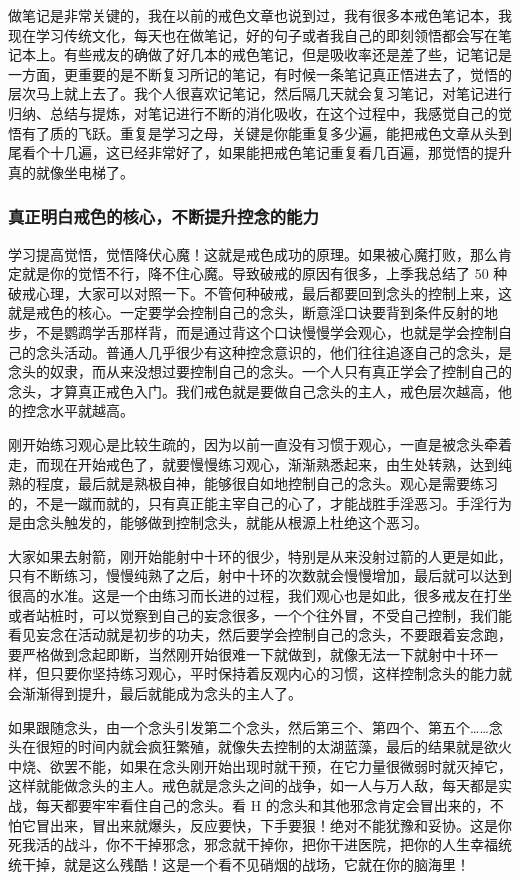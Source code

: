 做笔记是非常关键的，我在以前的戒色文章也说到过，我有很多本戒色笔记本，我现在学习传统文化，每天也在做笔记，好的句子或者我自己的即刻领悟都会写在笔记本上。有些戒友的确做了好几本的戒色笔记，但是吸收率还是差了些，记笔记是一方面，更重要的是不断复习所记的笔记，有时候一条笔记真正悟进去了，觉悟的层次马上就上去了。我个人很喜欢记笔记，然后隔几天就会复习笔记，对笔记进行归纳、总结与提炼，对笔记进行不断的消化吸收，在这个过程中，我感觉自己的觉悟有了质的飞跃。重复是学习之母，关键是你能重复多少遍，能把戒色文章从头到尾看个十几遍，这已经非常好了，如果能把戒色笔记重复看几百遍，那觉悟的提升真的就像坐电梯了。

\subsubsection{真正明白戒色的核心，不断提升控念的能力}

学习提高觉悟，觉悟降伏心魔！这就是戒色成功的原理。如果被心魔打败，那么肯定就是你的觉悟不行，降不住心魔。导致破戒的原因有很多，上季我总结了 50 种破戒心理，大家可以对照一下。不管何种破戒，最后都要回到念头的控制上来，这就是戒色的核心。一定要学会控制自己的念头，断意淫口诀要背到条件反射的地步，不是鹦鹉学舌那样背，而是通过背这个口诀慢慢学会观心，也就是学会控制自己的念头活动。普通人几乎很少有这种控念意识的，他们往往追逐自己的念头，是念头的奴隶，而从来没想过要控制自己的念头。一个人只有真正学会了控制自己的念头，才算真正戒色入门。我们戒色就是要做自己念头的主人，戒色层次越高，他的控念水平就越高。

刚开始练习观心是比较生疏的，因为以前一直没有习惯于观心，一直是被念头牵着走，而现在开始戒色了，就要慢慢练习观心，渐渐熟悉起来，由生处转熟，达到纯熟的程度，最后就是熟极自神，能够很自如地控制自己的念头。观心是需要练习的，不是一蹴而就的，只有真正能主宰自己的心了，才能战胜手淫恶习。手淫行为是由念头触发的，能够做到控制念头，就能从根源上杜绝这个恶习。

大家如果去射箭，刚开始能射中十环的很少，特别是从来没射过箭的人更是如此，只有不断练习，慢慢纯熟了之后，射中十环的次数就会慢慢增加，最后就可以达到很高的水准。这是一个由练习而长进的过程，我们观心也是如此，很多戒友在打坐或者站桩时，可以觉察到自己的妄念很多，一个个往外冒，不受自己控制，我们能看见妄念在活动就是初步的功夫，然后要学会控制自己的念头，不要跟着妄念跑，要严格做到念起即断，当然刚开始很难一下就做到，就像无法一下就射中十环一样，但只要你坚持练习观心，平时保持着反观内心的习惯，这样控制念头的能力就会渐渐得到提升，最后就能成为念头的主人了。

如果跟随念头，由一个念头引发第二个念头，然后第三个、第四个、第五个……念头在很短的时间内就会疯狂繁殖，就像失去控制的太湖蓝藻，最后的结果就是欲火中烧、欲罢不能，如果在念头刚开始出现时就干预，在它力量很微弱时就灭掉它，这样就能做念头的主人。戒色就是念头之间的战争，如一人与万人敌，每天都是实战，每天都要牢牢看住自己的念头。看 H 的念头和其他邪念肯定会冒出来的，不怕它冒出来，冒出来就爆头，反应要快，下手要狠！绝对不能犹豫和妥协。这是你死我活的战斗，你不干掉邪念，邪念就干掉你，把你干进医院，把你的人生幸福统统干掉，就是这么残酷！这是一个看不见硝烟的战场，它就在你的脑海里！

